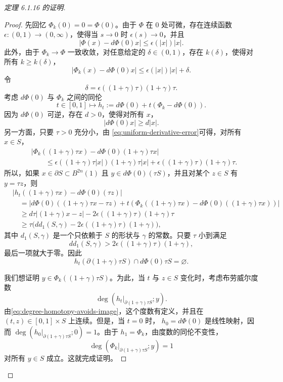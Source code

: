 \begin{proof}[定理 6.1.16 的证明]
\begin{proof}
先回忆 $\Phi_k(0)=0=\Phi(0)$。由于 $\Phi$ 在 $0$ 处可微，存在连续函数
$\epsilon:(0,1)\to(0,\infty)$，使得当 $s\to0$ 时
$\epsilon(s)\to0$，并且
\[
 |\Phi(x)-d\Phi(0)x|\leq\epsilon(|x|)|x|.
\]
此外，由于 $\Phi_k\to\Phi$ 一致收敛，对任意给定的
$\delta\in(0,1)$，存在 $k(\delta)$，使得对所有 $k\geq k(\delta)$，
\begin{equation}
 |\Phi_k(x)-d\Phi(0)x|
 \leq\epsilon(|x|)|x|+\delta.
 \label{eq:uniform-derivative-error}
\end{equation}
令
\[
 \delta=\epsilon((1+\gamma)\tau)(1+\gamma)\tau.
\]
考虑 $d\Phi(0)$ 与 $\Phi_k$ 之间的同伦
\[
 t\in[0,1]\longmapsto
 h_t:=d\Phi(0)+t(\Phi_k-d\Phi(0)).
\]
因为 $d\Phi(0)$ 可逆，存在 $d>0$，使得对所有 $x$，
\[
 |d\Phi(0)x|\geq d|x|.
\]
另一方面，只要 $\tau>0$ 充分小，由
\eqref{eq:uniform-derivative-error}可得，对所有 $x\in S$，
\[
\begin{aligned}
 &|\Phi_k((1+\gamma)\tau x)
   -d\Phi(0)(1+\gamma)\tau x|\\
 &\qquad\leq
 \epsilon((1+\gamma)\tau|x|)(1+\gamma)\tau|x|
 +\epsilon((1+\gamma)\tau)(1+\gamma)\tau.
\end{aligned}
\]
所以，如果 $x\in\partial S\subset B^{2n}(1)$ 且
$y\in d\Phi(0)(\tau S)$，并且对某个 $z\in S$ 有 $y=\tau z$，则
\[
\begin{aligned}
 &|h_t((1+\gamma)\tau x)-d\Phi(0)(\tau z)|\\
 &\quad={}
 |d\Phi(0)((1+\gamma)\tau x-\tau z)
 +t(\Phi_k((1+\gamma)\tau x)
       -d\Phi(0)((1+\gamma)\tau x))|\\
 &\quad\geq d\tau|(1+\gamma)x-z|
       -2\epsilon((1+\gamma)\tau)(1+\gamma)\tau\\
 &\quad\geq\tau\bigl(
   dd_1(S,\gamma)-2\epsilon((1+\gamma)\tau)(1+\gamma)\bigr),
\end{aligned}
\]
其中 $d_1(S,\gamma)$ 是一个只依赖于 $S$ 的形状与 $\gamma$ 的常数。只要 $\tau$ 小到满足
\[
 dd_1(S,\gamma)>2\epsilon((1+\gamma)\tau)(1+\gamma),
\]
最后一项就大于零。因此
\begin{equation}
 h_t(\partial(1+\gamma)\tau S)
 \cap d\Phi(0)\tau S=\varnothing.
 \label{eq:degree-homotopy-avoids-image}
\end{equation}

我们想证明 $y\in\Phi_k((1+\gamma)\tau S)$。为此，当 $t$ 与
$z\in S$ 变化时，考虑布劳威尔度数
\[
 \deg(h_t|_{\partial(1+\gamma)\tau S};y).
\]
由\eqref{eq:degree-homotopy-avoids-image}，这个度数有定义，并且在
$(t,z)\in[0,1]\times S$ 上连续。但是，当 $t=0$ 时，
$h_0=d\Phi(0)$ 是线性映射，因而
$\deg(h_0|_{\partial(1+\gamma)\tau S};0)=1$。由于
$h_1=\Phi_k$，由度数的同伦不变性，
\[
 \deg(\Phi_k|_{\partial(1+\gamma)\tau S};y)=1
\]
对所有 $y\in S$ 成立。这就完成证明。
\end{proof}


\end{proof}
